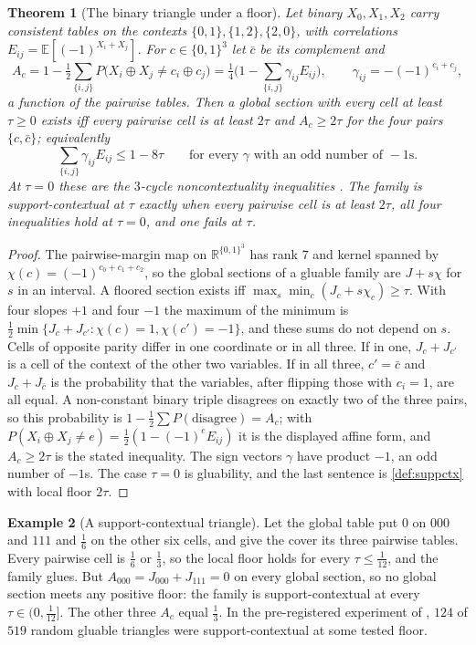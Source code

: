 \documentclass[11pt]{article}
\newtheorem{theorem}{Theorem}[section]
\theoremstyle{definition}
\newtheorem{example}[theorem]{Example}
\theoremstyle{remark}
\begin{document}
\begin{theorem}[The binary triangle under a floor]\label{thm:floortriangle}
Let binary $X_0,X_1,X_2$ carry consistent tables on the contexts $\{0,1\},\{1,2\},\{2,0\}$, with correlations
$E_{ij}=\mathbb E[(-1)^{X_i+X_j}]$. For $c\in\{0,1\}^3$ let $\bar c$ be its complement and
\[
A_c=1-\tfrac12\sum_{\{i,j\}}P\big(X_i\oplus X_j\ne c_i\oplus c_j\big)=\tfrac14\Big(1-\sum_{\{i,j\}}\gamma_{ij}E_{ij}\Big),\qquad
\gamma_{ij}=-(-1)^{c_i+c_j},
\]
a function of the pairwise tables. Then a global section with every cell at least $\tau\ge0$ exists iff every pairwise cell is at
least $2\tau$ and $A_c\ge2\tau$ for the four pairs $\{c,\bar c\}$; equivalently
\[
\sum_{\{i,j\}}\gamma_{ij}E_{ij}\le1-8\tau\qquad\text{for every }\gamma\text{ with an odd number of }-1\text{s}.
\]
At $\tau=0$ these are the $3$-cycle noncontextuality inequalities \cite{AraujoEtAl2013}. The family is support-contextual at $\tau$
exactly when every pairwise cell is at least $2\tau$, all four inequalities hold at $\tau=0$, and one fails at $\tau$.
\end{theorem}
\begin{proof}
The pairwise-margin map on $\mathbb R^{\{0,1\}^3}$ has rank $7$ and kernel spanned by $\chi(c)=(-1)^{c_0+c_1+c_2}$, so the global
sections of a gluable family are $J+s\chi$ for $s$ in an interval. A floored section exists iff
$\max_s\min_c(J_c+s\chi_c)\ge\tau$. With four slopes $+1$ and four $-1$ the maximum of the minimum is
$\tfrac12\min\{J_c+J_{c'}:\chi(c)=1,\chi(c')=-1\}$, and these sums do not depend on $s$. Cells of opposite parity differ in one
coordinate or in all three. If in one, $J_c+J_{c'}$ is a cell of the context of the other two variables. If in all three,
$c'=\bar c$ and $J_c+J_{\bar c}$ is the probability that the variables, after flipping those with $c_i=1$, are all equal. A
non-constant binary triple disagrees on exactly two of the three pairs, so this probability is
$1-\tfrac12\sum P(\text{disagree})=A_c$; with $P(X_i\oplus X_j\ne e)=\tfrac12(1-(-1)^eE_{ij})$ it is the displayed affine form, and
$A_c\ge2\tau$ is the stated inequality. The sign vectors $\gamma$ have product $-1$, an odd number of $-1$s. The case $\tau=0$ is
gluability, and the last sentence is \cref{def:suppctx} with local floor $2\tau$.
\end{proof}

\begin{example}[A support-contextual triangle]\label{ex:suppctx}
Let the global table put $0$ on $000$ and $111$ and $\tfrac16$ on the other six cells, and give the cover its three pairwise
tables. Every pairwise cell is $\tfrac16$ or $\tfrac13$, so the local floor holds for every $\tau\le\tfrac1{12}$, and the family glues.
But $A_{000}=J_{000}+J_{111}=0$ on every global section, so no global section meets any positive floor: the family is
support-contextual at every $\tau\in(0,\tfrac1{12}]$. The other three $A_c$ equal $\tfrac13$. In the pre-registered experiment of
\cite[Section~14]{Awasthi-Validation}, $124$ of $519$ random gluable triangles were support-contextual at some tested floor.
\end{example}
\end{document}
